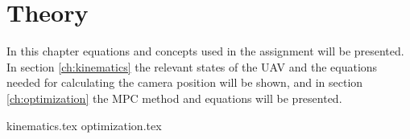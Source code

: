 \chapter{Theory}

In this chapter equations and concepts used in the assignment will be presented. In section \ref{ch:kinematics} the  relevant states of the UAV and the equations needed for calculating the camera position will be shown, and in section \ref{ch:optimization} the MPC method and equations will be presented.


{kinematics.tex}
{optimization.tex}